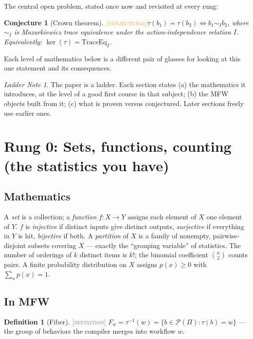 \documentclass[11pt]{article}
\newcommand{\DEFINITION}{\textcolor{gray}{\textsc{[definition]}}}
\newcommand{\CONJECTURAL}{\textcolor{orange}{\textsc{[conjectural]}}}
\newcommand{\PT}{\Pi}
\newcommand{\PS}{\mathcal{P}(\PT)}
\newcommand{\fib}[1]{F_{#1}}
\theoremstyle{plain}
\newtheorem{conjecture}[theorem]{Conjecture}
\theoremstyle{definition}
\newtheorem{definition}[theorem]{Definition}
\theoremstyle{remark}
\newtheorem{ladder}[theorem]{Ladder Note}
\begin{document}
The central open problem, stated once now and revisited at every rung:

\begin{conjecture}[Crown theorem]\CONJECTURAL\label{conj:crown}
$\tau(b_1) = \tau(b_2) \iff b_1 \sim_I b_2$, where $\sim_I$ is
Mazurkiewicz trace equivalence under the action-independence relation $I$.
Equivalently: $\ker(\tau) = \mathrm{TraceEq}_I$.
\end{conjecture}

Each level of mathematics below is a different pair of glasses for looking
at this one statement and its consequences.

\begin{ladder}
The paper is a ladder. Each section states (a) the mathematics it
introduces, at the level of a good first course in that subject; (b) the
MFW objects built from it; (c) what is proven versus conjectured. Later
sections freely use earlier ones.
\end{ladder}

\section{Rung 0: Sets, functions, counting (the statistics you have)}
\label{sec:rung0}

\subsection{Mathematics}
A \emph{set} is a collection; a \emph{function} $f : X \to Y$ assigns each
element of $X$ one element of $Y$. $f$ is \emph{injective} if distinct
inputs give distinct outputs, \emph{surjective} if everything in $Y$ is
hit, \emph{bijective} if both. A \emph{partition} of $X$ is a family of
nonempty, pairwise-disjoint subsets covering $X$ --- exactly the ``grouping
variable'' of statistics. The number of orderings of $k$ distinct items is
$k!$; the binomial coefficient $\binom{n}{2}$ counts pairs. A finite
probability distribution on $X$ assigns $p(x) \ge 0$ with $\sum_x p(x) = 1$.

\subsection{In MFW}
\begin{definition}[Fiber]\DEFINITION\;
$\fib{w} = \tau^{-1}(w) = \{b \in \PS : \tau(b) = w\}$ --- the group of
behaviors the compiler merges into workflow $w$.
\end{definition}
\end{document}
